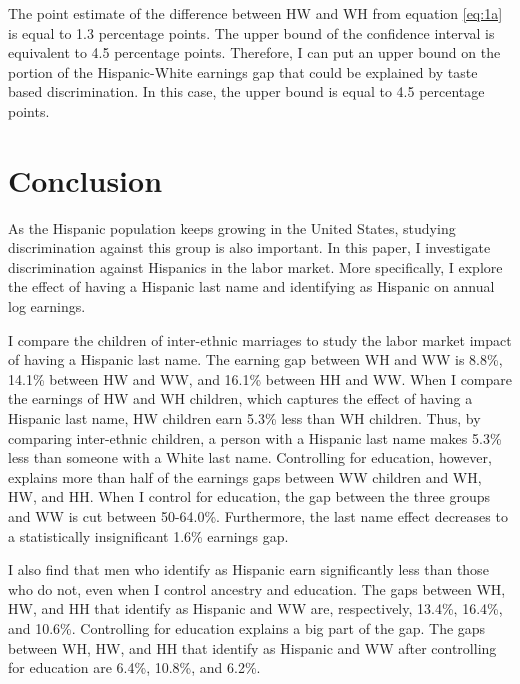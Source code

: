 \documentclass{wptemp}
\begin{document}
The point estimate of the difference between HW and WH from equation \ref{eq:1a} is equal to 1.3 percentage points. The upper bound of the confidence interval is equivalent to 4.5 percentage points. Therefore, I can put an upper bound on the portion of the Hispanic-White earnings gap that could be explained by taste based discrimination. In this case, the upper bound is equal to 4.5 percentage points.

\section{Conclusion}\label{sec:con}

As the Hispanic population keeps growing in the United States, studying discrimination against this group is also important. In this paper, I investigate discrimination against Hispanics in the labor market. More specifically, I explore the effect of having a Hispanic last name and identifying as Hispanic on annual log earnings. 

I compare the children of inter-ethnic marriages to study the labor market impact of having a Hispanic last name. The earning gap between WH and WW is 8.8\%, 14.1\% between HW and WW, and 16.1\% between HH and WW. When I compare the earnings of HW and WH children, which captures the effect of having a Hispanic last name, HW children earn 5.3\% less than WH children. Thus, by comparing inter-ethnic children, a person with a Hispanic last name makes 5.3\% less than someone with a White last name. Controlling for education, however, explains more than half of the earnings gaps between WW children and WH, HW, and HH. When I control for education, the gap between the three groups and WW is cut between 50-64.0\%. Furthermore, the last name effect decreases to a statistically insignificant 1.6\% earnings gap.

I also find that men who identify as Hispanic earn significantly less than those who do not, even when I control ancestry and education. The gaps between WH, HW, and HH that identify as Hispanic and WW are, respectively, 13.4\%, 16.4\%, and 10.6\%. Controlling for education explains a big part of the gap. The gaps between WH, HW, and HH that identify as Hispanic and WW after controlling for education are 6.4\%, 10.8\%, and 6.2\%. 
\end{document}

